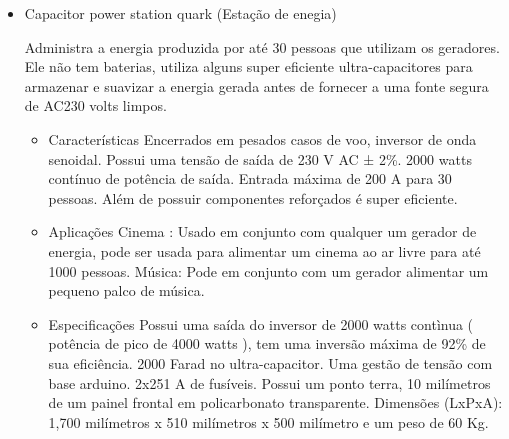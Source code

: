 \begin{itemize}
	\item Capacitor power station quark (Estação de enegia)
	
	Administra a energia produzida por até 30 pessoas que utilizam os geradores. Ele não tem baterias, utiliza alguns super eficiente ultra-capacitores para armazenar e suavizar a energia gerada antes de fornecer a uma fonte segura de AC230 volts limpos.
	\begin{itemize}
		\item Características
		Encerrados em pesados casos de voo, inversor de onda senoidal. Possui uma tensão de saída de 230 V AC ± 2\%. 2000 watts contínuo de potência de saída. Entrada máxima de 200 A para 30 pessoas. Além de possuir componentes reforçados é super eficiente.
	\end{itemize}
	
	\begin{itemize}
		\item Aplicações
		Cinema : Usado em conjunto com qualquer um gerador de energia, pode ser usada para alimentar um cinema ao ar livre para até 1000 pessoas.
Música: Pode em conjunto com um gerador alimentar um pequeno palco de música.
	\end{itemize}
	
	\begin{itemize}
		\item Especificações
		Possui uma saída do inversor de 2000 watts contìnua ( potência de pico de 4000 watts ), tem uma inversão máxima de 92\% de sua eficiência. 2000 Farad no ultra-capacitor. Uma gestão de tensão com base arduino. 2x251 A de fusíveis. Possui um ponto terra, 10 milímetros de um painel frontal em policarbonato transparente. Dimensões (LxPxA): 1,700 milímetros x 510 milímetros x 500 milímetro e um peso de 60 Kg.
	\end{itemize}
	

\end{itemize}
